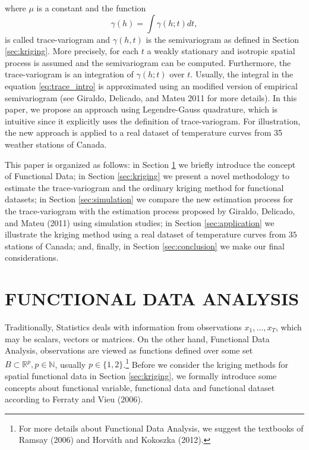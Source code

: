 \documentclass[
  12pt,
]{article}
\theoremstyle{definition}
\theoremstyle{definition}
\theoremstyle{definition}
\theoremstyle{remark}
\begin{document}
where \(\mu\) is a constant and the function
\begin{equation} \label{eq:trace_intro}
 \gamma(h) = \int \gamma(h;t)dt,
\end{equation}
is called trace-variogram and \(\gamma(h, t)\) is the semivariogram as defined in Section \ref{sec:kriging}.
More precisely, for each \(t\) a weakly stationary and isotropic spatial process is assumed and the semivariogram can be computed. Furthermore, the trace-variogram is an
integration of \(\gamma(h;t)\) over \(t\). Usually, the integral in the equation \ref{eq:trace_intro} is approximated using an modified version of empirical semivariogram (see Giraldo, Delicado, and Mateu 2011 for more details).
In this paper, we propose an approach using Legendre-Gauss quadrature, which is intuitive since it explicitly uses the definition of trace-variogram.
For illustration, the new approach is applied to a real dataset of temperature curves from 35 weather stations of Canada.

This paper is organized as follows: in Section \ref{sec:functionalDataAnalysis} we briefly introduce the concept of Functional Data; in Section \ref{sec:kriging} we present a novel methodology to estimate the trace-variogram and the ordinary kriging method for functional datasets; in Section \ref{sec:simulation} we compare the new estimation process for the trace-variogram with the estimation process proposed by Giraldo, Delicado, and Mateu (2011) using simulation studies;
in Section \ref{sec:application} we illustrate the kriging method using a real dataset of temperature curves from \(35\) stations of Canada; and, finally, in Section \ref{sec:conclusion} we make our final considerations.

\hypertarget{sec:functionalDataAnalysis}{%
\section{FUNCTIONAL DATA ANALYSIS}\label{sec:functionalDataAnalysis}}

Traditionally, Statistics deals with information from observations \(x_1, \dots, x_T\), which may be scalars, vectors or matrices. On the other hand, Functional Data Analysis,
observations are viewed as functions defined over some set \(B \subset \mathbb{R}^p, p \in \mathbb{N}\), usually \(p \in \{1,2\}\).\footnote{For more details about Functional Data Analysis, we suggest the textbooks of Ramsay (2006) and Horváth and Kokoszka (2012).} Before we consider the kriging methods for spatial functional data in Section \ref{sec:kriging}, we formally introduce some concepts about functional variable, functional data and functional dataset
according to Ferraty and Vieu (2006).
\end{document}
